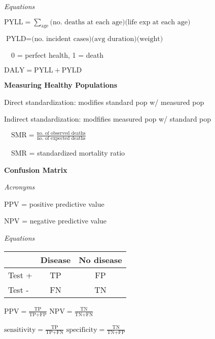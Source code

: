 \documentclass[twocolumn]{article}
\begin{document}
\vspace{-.5em}
\dotfill

\textit{Equations}

$\text{PYLL} = \sum_{\text{age}} \text{(no. deaths at each age)} \text{(life exp at each age)}$

$\text{PYLD} = \text{(no. incident cases)} \text{(avg duration)} \text{(weight)}$

$\quad$0 = perfect health, 1 = death

$\text{DALY} = \text{PYLL} + \text{PYLD}$

\vspace{-.5em}
\dotfill

\textbf{Measuring Healthy Populations}

Direct standardization: modifies standard pop w/ measured pop

Indirect standardization: modfifies measured pop w/ standard pop

$\quad \text{SMR} = \frac{\text{no. of observed deaths}}{\text{no. of expected deaths}}$

$\quad$SMR = standardized mortality ratio


\newpage


\textbf{Confusion Matrix}

\textit{Acronyms}

PPV = positive predictive value

NPV = negative predictive value

\vspace{-.5em}
\dotfill

\textit{Equations}

\begin{table}[h]
    \centering
    \begin{tabular}{lcc}
        \toprule
        & Disease & No disease \\
        \midrule
        Test + & TP & FP \\
        Test - & FN & TN \\
        \bottomrule
    \end{tabular}
\end{table}

$\text{PPV} = \frac{\text{TP}}{\text{TP} + \text{FP}}$ \hfill $\text{NPV} = \frac{\text{TN}}{\text{TN} + \text{FN}}$

$\text{sensitivity} = \frac{\text{TP}}{\text{TP} + \text{FN}}$ \hfill \hfill $\text{specificity} = \frac{\text{TN}}{\text{TN} + \text{FP}}$

\dotfill
\end{document}
